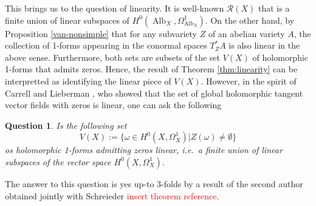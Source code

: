 \documentclass[12pt,reqno]{amsart}
\theoremstyle{question}
\newtheorem{question}[theorem]{Question}
\theoremstyle{definition}
\theoremstyle{remark}
\theoremstyle{cited}
\theoremstyle{citeddef}
\DeclareMathOperator{\Alb}{Alb}
\newcommand{\sR}{\mathcal{R}}
\newcommand{\sorry}[1]{\textcolor{red}{#1}}
\begin{document}
This brings us to the question of linearity. It is well-known \cite[p.\ 311]{Ara92} $\sR(X)$ that is a finite union of linear subspaces of $H^0(\Alb_X, \Omega_{\Alb_X}^1)$. 
On the other hand, by Proposition \ref{van-nonsimple} that for any subvariety $Z$ of an abelian variety $A$, the collection
of 1-forms appearing in the conormal spaces $T^*_ZA$ is also linear in the above sense. Furthermore, both sets are subsets of the set $V(X)$ of holomorphic 1-forms that admits zeros. Hence, the result of Theorem \ref{thm:linearity} can be interpretted as identifying the linear piece of $V(X)$. 
However, in the spirit of Carrell and Lieberman \cite{CL73}, who showed that
the set of global holomorphic tangent vector fields with zeros
is linear,
one can ask the following 
\begin{question}
Is the following set
\[V(X):=\{ \omega\in H^0(X, \Omega_X^1) | Z(\omega)\neq \emptyset\}\]
os holomorphic 1-forms admitting zeros linear, i.e.\ a finite
union of linear subspaces of the vector space $H^0(X, \Omega_X^1)$.
\end{question} 

The answer to this question is yes up-to 3-folds by
a result of the second author obtained jointly with Schreieder
\sorry{insert theorem reference}.  


\end{document}
